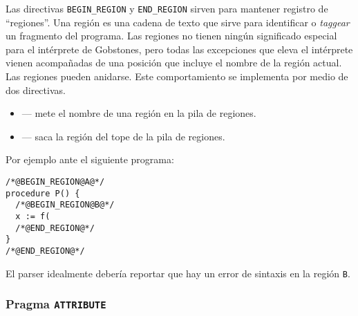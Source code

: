 \documentclass{article}
\begin{document}
Las directivas \texttt{BEGIN\_REGION} y \texttt{END\_REGION} sirven para
mantener registro de ``regiones''. Una regi\'on es una cadena de texto que
sirve para identificar o {\em taggear} un fragmento del programa.
Las regiones no tienen ning\'un significado
especial para el int\'erprete de Gobstones, pero todas las excepciones que
eleva el int\'erprete vienen acompa\~nadas de una posici\'on que incluye
el nombre de la regi\'on actual. Las regiones pueden anidarse.
Este comportamiento se implementa por medio de dos directivas.
\begin{itemize}
\item {} ---
       mete el nombre de una regi\'on en la pila de regiones.
\item {} --- saca la regi\'on del tope de la pila de regiones.
\end{itemize}
Por ejemplo ante el siguiente programa:
\begin{verbatim}
/*@BEGIN_REGION@A@*/
procedure P() {
  /*@BEGIN_REGION@B@*/
  x := f(
  /*@END_REGION@*/
}
/*@END_REGION@*/
\end{verbatim}
El parser idealmente deber\'ia reportar que hay un error de sintaxis en la regi\'on \texttt{B}.

\subsubsection{Pragma \texttt{ATTRIBUTE}}
\end{document}
